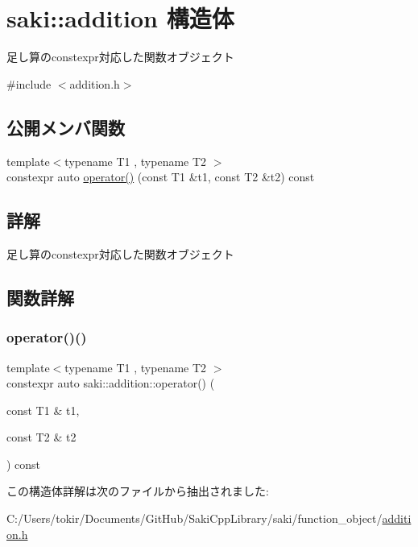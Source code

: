 \hypertarget{structsaki_1_1addition}{}\section{saki\+:\+:addition 構造体}
\label{structsaki_1_1addition}


足し算のconstexpr対応した関数オブジェクト  




{\ttfamily \#include $<$addition.\+h$>$}

\subsection*{公開メンバ関数}
\begin{DoxyCompactItemize}
\item 
{\footnotesize template$<$typename T1 , typename T2 $>$ }\\constexpr auto \mbox{\hyperlink{structsaki_1_1addition_a8bdb3c15f72b4d0f48967fdaa1472049}{operator()}} (const T1 \&t1, const T2 \&t2) const
\end{DoxyCompactItemize}


\subsection{詳解}
足し算のconstexpr対応した関数オブジェクト 

\subsection{関数詳解}
\mbox{\label{structsaki_1_1addition_a8bdb3c15f72b4d0f48967fdaa1472049}} 
\subsubsection{\texorpdfstring{operator()()}{operator()()}}
{\footnotesize\ttfamily template$<$typename T1 , typename T2 $>$ \\
constexpr auto saki\+::addition\+::operator() (\begin{DoxyParamCaption}\item[{const T1 \&}]{t1,  }\item[{const T2 \&}]{t2 }\end{DoxyParamCaption}) const\hspace{0.3cm}{\ttfamily [inline]}}



この構造体詳解は次のファイルから抽出されました\+:\begin{DoxyCompactItemize}
\item 
C\+:/\+Users/tokir/\+Documents/\+Git\+Hub/\+Saki\+Cpp\+Library/saki/function\+\_\+object/\mbox{\hyperlink{addition_8h}{addition.\+h}}\end{DoxyCompactItemize}
